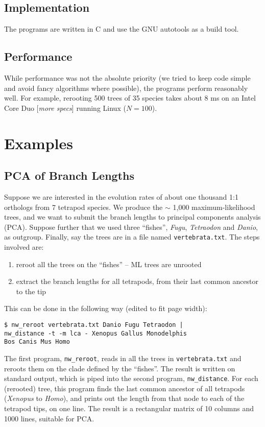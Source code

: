 \documentclass[a4paper,11pt]{article}
\newcommand{\prog}[1]{\texttt{nw\_#1}}
\begin{document}
\subsection*{Implementation}

The programs are written in C and use the \textsc{GNU} autotools as a build tool.

\subsection*{Performance}

While performance was not the absolute priority (we tried to keep code simple and avoid fancy algorithms where possible), the programs perform reasonably well. For example, rerooting 500 trees of 35 species takes about 8 ms on an Intel Core Duo [\textit{more specs}] running Linux ($N = 100$).

\section*{Examples}

\subsection*{PCA of Branch Lengths}

Suppose we are interested in the evolution rates of about one thousand 1:1 orthologs from 7 tetrapod species. We produce the $\sim$ 1,000 maximum-likelihood trees, and we want to submit the branch lengths to principal components analysis (\textsc{PCA}). Suppose further that we used three ``fishes'', \textit{Fugu}, \textit{Tetraodon} and \textit{Danio}, as outgroup. Finally, say the trees are in a file named \texttt{vertebrata.txt}. The steps involved are:
\begin{enumerate}
 \item reroot all the trees on the ``fishes'' -- ML trees are unrooted
 \item extract the branch lengths for all tetrapods, from their last common ancestor to the tip
\end{enumerate}
This can be done in the following way (edited to fit page width):

\begin{verbatim}
$ nw_reroot vertebrata.txt Danio Fugu Tetraodon | 
nw_distance -t -m lca - Xenopus Gallus Monodelphis
Bos Canis Mus Homo 
\end{verbatim}

The first program, \prog{reroot}, reads in all the trees in \texttt{vertebrata.txt} and reroots them on the clade defined by the ``fishes''. The result is written on standard output, which is piped into the second program, \prog{distance}. For each (rerooted) tree, this program finds the last common ancestor of all tetrapods (\textit{Xenopus} to \textit{Homo}), and prints out the length from that node to each of the tetrapod tips, on one line. The result is a rectangular matrix of 10 columns and 1000 lines, suitable for \textsc{PCA}.
\end{document}
